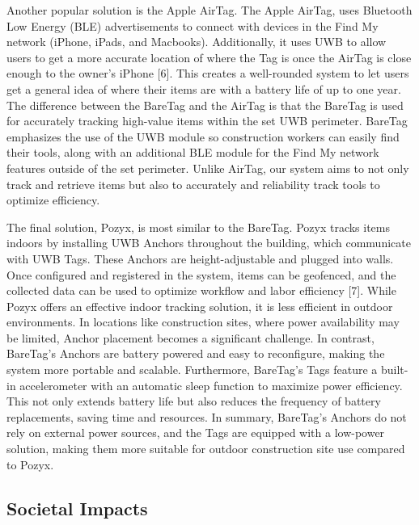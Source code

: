 \documentclass[conference]{IEEEtran}
\begin{document}
Another popular solution is the Apple AirTag.
The Apple AirTag, uses Bluetooth Low Energy (BLE) advertisements to connect
with devices in the Find My network (iPhone, iPads, and Macbooks). 
Additionally, it uses UWB to allow users to get a more accurate location of where 
the Tag is once the AirTag is close enough to the owner's iPhone [6]. This 
creates a well-rounded system to let users get a general idea of where 
their items are with a battery life of up to one year. The difference 
between the BareTag and the AirTag is that the BareTag is used for 
accurately tracking high-value items within the set UWB perimeter. 
BareTag emphasizes the use of the UWB module so construction workers 
can easily find their tools, along with an additional BLE module for 
the Find My network features outside of the set perimeter. Unlike AirTag, 
our system aims to not only track and retrieve items but also to accurately 
and reliability track tools to optimize efficiency.

The final solution, Pozyx, is most similar to the BareTag. Pozyx tracks 
items indoors by installing UWB Anchors throughout the building, which 
communicate with UWB Tags. These Anchors are height-adjustable and 
plugged into walls. Once configured and registered in the system, 
items can be geofenced, and the collected data can be used to optimize 
workflow and labor efficiency [7]. While Pozyx offers an effective 
indoor tracking solution, it is less efficient in outdoor environments. 
In locations like construction sites, where power availability may be 
limited, Anchor placement becomes a significant challenge. In contrast, 
BareTag’s Anchors are battery powered and easy to reconfigure, 
making the system more portable and scalable. 
Furthermore, BareTag’s Tags feature a built-in accelerometer with an 
automatic sleep function to maximize power efficiency. This not only 
extends battery life but also reduces the frequency of battery 
replacements, saving time and resources. In summary, BareTag's Anchors 
do not rely on external power sources, and the Tags are equipped with a 
low-power solution, making them more suitable for outdoor construction 
site use compared to Pozyx.

\subsection{Societal Impacts}
\end{document}
